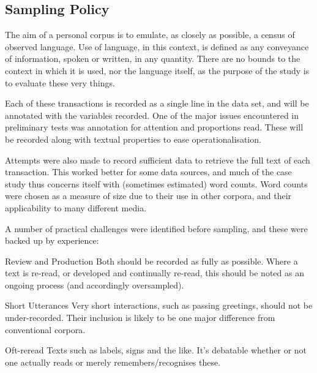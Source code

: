 \subsection{Sampling Policy}
\label{sec:personal:samplingpolicy}
The aim of a personal corpus is to emulate, as closely as possible, a census of observed language.  Use of language, in this context, is defined as any conveyance of information, spoken or written, in any quantity. There are no bounds to the context in which it is used, nor the language itself, as the purpose of the study is to evaluate these very things.

Each of these transactions is recorded as a single line in the data set, and will be annotated with the variables recorded.  One of the major issues encountered in preliminary tests was annotation for attention and proportions read.  These will be recorded along with textual properties to ease operationalisation.

Attempts were also made to record sufficient data to retrieve the full text of each transaction.  This worked better for some data sources, and much of the case study thus concerns itself with (sometimes estimated) word counts.  Word counts were chosen as a measure of size due to their use in other corpora, and their applicability to many different media.


A number of practical challenges were identified before sampling, and these were backed up by experience:
\begin{itemizeTitle}
    \item[Review and Production] Both should be recorded as fully as possible. Where a text is re-read, or developed and continually re-read, this should be noted as an ongoing process (and accordingly oversampled).
    \item[Short Utterances] Very short interactions, such as passing greetings, should not be under-recorded. Their inclusion is likely to be one major difference from conventional corpora.
    \item[Oft-reread Texts] such as labels, signs and the like. It’s debatable whether or not one actually reads or merely remembers/recognises these. 
            
\end{itemizeTitle}
